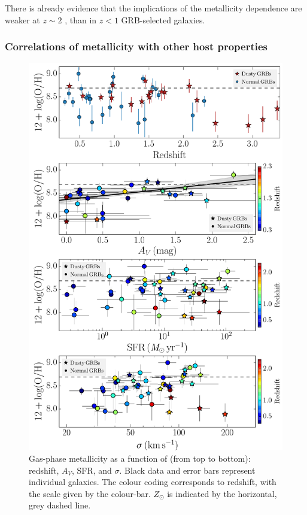 \documentclass[traditabstract, longauth]{aa}
\begin{document}
There is already evidence that the implications of the metallicity dependence are weaker at $z\sim2$ \citep{2013ApJ...778..128P, 2015arXiv150304246S}, than in $z<1$ GRB-selected galaxies.

\subsubsection{Correlations of metallicity with other host properties}
\label{sec:corrzz}

\begin{figure}
\includegraphics[angle=0, width=0.99\columnwidth]{Figs/Z_z.pdf}
\caption{Gas-phase metallicity as a function of (from top to bottom): redshift, $A_V$, SFR, and $\sigma$. Black data and error bars represent individual galaxies. The colour coding corresponds to redshift, with the scale given by the colour-bar. $Z_{\odot}$ is indicated by the horizontal, grey dashed line.}
\label{fig:zprop}
\end{figure}
\end{document}
